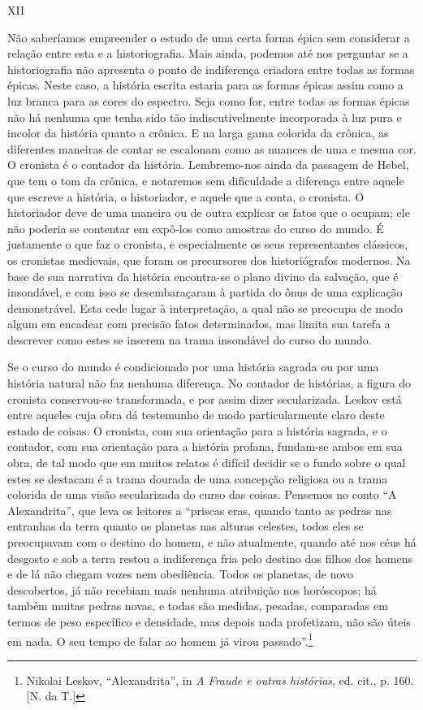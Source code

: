 XII

Não saberíamos empreender o estudo de uma certa forma épica sem
considerar a relação entre esta e a historiografia. Mais ainda, podemos
até nos perguntar se a historiografia não apresenta o ponto de
indiferença criadora entre todas as formas épicas. Neste caso, a
história escrita estaria para as formas épicas assim como a luz branca
para as cores do espectro. Seja como for, entre todas as formas épicas
não há nenhuma que tenha sido tão indiscutivelmente incorporada à luz
pura e incolor da história quanto a crônica. E na larga gama colorida da
crônica, as diferentes maneiras de contar se escalonam como as nuances
de uma e mesma cor. O cronista é o contador da história. Lembremo-nos
ainda da passagem de Hebel, que tem o tom da crônica, e notaremos sem
dificuldade a diferença entre aquele que escreve a história, o
historiador, e aquele que a conta, o cronista. O historiador deve de uma
maneira ou de outra explicar os fatos que o ocupam; ele não poderia se
contentar em expô-los como amostras do curso do mundo. É justamente o
que faz o cronista, e especialmente os seus representantes clássicos, os
cronistas medievais, que foram os precursores dos historiógrafos
modernos. Na base de sua narrativa da história encontra-se o plano
divino da salvação, que é insondável, e com isso se desembaraçaram à
partida do ônus de uma explicação demonstrável. Esta cede lugar à
interpretação, a qual não se preocupa de modo algum em encadear com
precisão fatos determinados, mas limita sua tarefa a descrever como
estes se inserem na trama insondável do curso do mundo.

Se o curso do mundo é condicionado por uma história sagrada ou por uma
história natural não faz nenhuma diferença. No contador de histórias, a
figura do cronista conservou-se transformada, e por assim dizer
secularizada. Leskov está entre aqueles cuja obra dá testemunho de modo
particularmente claro deste estado de coisas. O cronista, com sua
orientação para a história sagrada, e o contador, com sua orientação
para a história profana, fundam-se ambos em sua obra, de tal modo que em
muitos relatos é difícil decidir se o fundo sobre o qual estes se
destacam é a trama dourada de uma concepção religiosa ou a trama
colorida de uma visão secularizada do curso das coisas. Pensemos no
conto ``A Alexandrita'', que leva os leitores a ``priscas eras, quando
tanto as pedras nas entranhas da terra quanto os planetas nas alturas
celestes, todos eles se preocupavam com o destino do homem, e não
atualmente, quando até nos céus há desgosto e sob a terra restou a
indiferença fria pelo destino dos filhos dos homens e de lá não chegam
vozes nem obediência. Todos os planetas, de novo descobertos, já não
recebiam mais nenhuma atribuição nos horóscopos; há também muitas pedras
novas, e todas são medidas, pesadas, comparadas em termos de peso
específico e densidade, mas depois nada profetizam, não são úteis em
nada. O seu tempo de falar ao homem já virou passado''.\footnote{Nikolai
  Leskov, ``Alexandrita'', in \emph{A Fraude e outras histórias}, ed.
  cit., p. 160. {[}N. da T.{]}}

